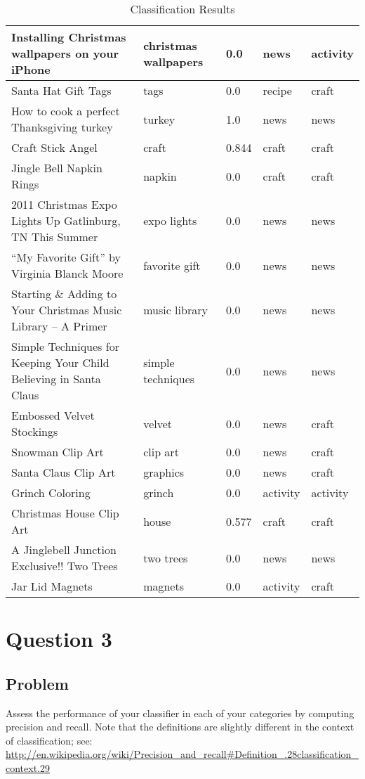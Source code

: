 \documentclass[letterpaper,11pt]{report}
\begin{document}
\begin{savenotes}
\begin{table}[htbp]
\begin{tabular}{|p{8cm}|l|l|l|l|}
Installing Christmas wallpapers on your iPhone&christmas wallpapers&0.0&news&activity\\ \hline
Santa Hat Gift Tags&tags&0.0&recipe&craft\\ \hline
How to cook a perfect Thanksgiving turkey&turkey&1.0&news&news\\ \hline
Craft Stick Angel&craft&0.844&craft&craft\\ \hline
Jingle Bell Napkin Rings&napkin&0.0&craft&craft\\ \hline
2011 Christmas Expo Lights Up Gatlinburg, TN This Summer&expo lights&0.0&news&news\\ \hline
``My Favorite Gift'' by Virginia Blanck Moore&favorite gift&0.0&news&news\\ \hline
Starting \& Adding to Your Christmas Music Library – A Primer&music library&0.0&news&news\\ \hline
Simple Techniques for Keeping Your Child Believing in Santa Claus&simple techniques&0.0&news&news\\ \hline
Embossed Velvet Stockings&velvet&0.0&news&craft\\ \hline
Snowman Clip Art&clip art&0.0&news&craft\\ \hline
Santa Claus Clip Art&graphics&0.0&news&craft\\ \hline
Grinch Coloring&grinch&0.0&activity&activity\\ \hline
Christmas House Clip Art&house&0.577&craft&craft\\ \hline
A Jinglebell Junction Exclusive!! Two Trees&two trees&0.0&news&news\\ \hline
Jar Lid Magnets&magnets&0.0&activity&craft\\ \hline

		\end{tabular}
	\caption{Classification Results}
	\label{tab:results}
\end{table}


\section{Question 3}
\subsection{Problem}Assess the performance of your classifier in each of your categories by computing precision and recall.  Note that the definitions are slightly different in the context of classification; see: \small\url{http://en.wikipedia.org/wiki/Precision_and_recall#Definition_.28classification_context.29}\par

\end{savenotes}
\end{document}
